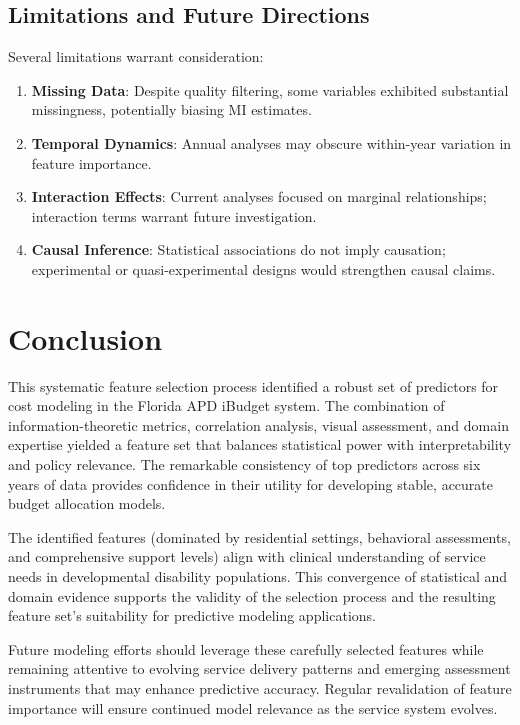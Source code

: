 \subsection{Limitations and Future Directions}
\label{subsec:limitations}

Several limitations warrant consideration:

\begin{enumerate}
    \item \textbf{Missing Data}: Despite quality filtering, some variables exhibited substantial missingness, potentially biasing MI estimates.
    
    \item \textbf{Temporal Dynamics}: Annual analyses may obscure within-year variation in feature importance.
    
    \item \textbf{Interaction Effects}: Current analyses focused on marginal relationships; interaction terms warrant future investigation.
    
    \item \textbf{Causal Inference}: Statistical associations do not imply causation; experimental or quasi-experimental designs would strengthen causal claims.
\end{enumerate}

\section{Conclusion}
\label{sec:feature-selection-conclusion}

This systematic feature selection process identified a robust set of predictors for cost modeling in the Florida APD iBudget system. The combination of information-theoretic metrics, correlation analysis, visual assessment, and domain expertise yielded a feature set that balances statistical power with interpretability and policy relevance. The remarkable consistency of top predictors across six years of data provides confidence in their utility for developing stable, accurate budget allocation models.

The identified features (dominated by residential settings, behavioral assessments, and comprehensive support levels) align with clinical understanding of service needs in developmental disability populations. This convergence of statistical and domain evidence supports the validity of the selection process and the resulting feature set's suitability for predictive modeling applications.

Future modeling efforts should leverage these carefully selected features while remaining attentive to evolving service delivery patterns and emerging assessment instruments that may enhance predictive accuracy. Regular revalidation of feature importance will ensure continued model relevance as the service system evolves.